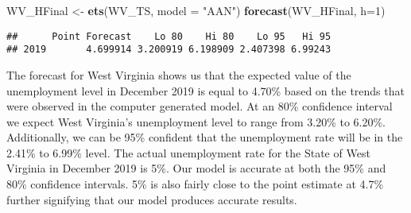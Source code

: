 \documentclass[
]{article}
\newenvironment{Shaded}{\begin{snugshade}}{\end{snugshade}}
\newcommand{\DataTypeTok}[1]{\textcolor[rgb]{0.13,0.29,0.53}{#1}}
\newcommand{\DecValTok}[1]{\textcolor[rgb]{0.00,0.00,0.81}{#1}}
\newcommand{\KeywordTok}[1]{\textcolor[rgb]{0.13,0.29,0.53}{\textbf{#1}}}
\newcommand{\NormalTok}[1]{#1}
\newcommand{\StringTok}[1]{\textcolor[rgb]{0.31,0.60,0.02}{#1}}
\begin{document}
\begin{Shaded}
\begin{Highlighting}[]
\NormalTok{WV_HFinal <-}\StringTok{ }\KeywordTok{ets}\NormalTok{(WV_TS, }\DataTypeTok{model =} \StringTok{"AAN"}\NormalTok{)}
\KeywordTok{forecast}\NormalTok{(WV_HFinal, }\DataTypeTok{h=}\DecValTok{1}\NormalTok{)}
\end{Highlighting}
\end{Shaded}

\begin{verbatim}
##      Point Forecast    Lo 80    Hi 80    Lo 95   Hi 95
## 2019       4.699914 3.200919 6.198909 2.407398 6.99243
\end{verbatim}

The forecast for West Virginia shows us that the expected value of the
unemployment level in December 2019 is equal to 4.70\% based on the
trends that were observed in the computer generated model. At an 80\%
confidence interval we expect West Virginia's unemployment level to
range from 3.20\% to 6.20\%. Additionally, we can be 95\% confident that
the unemployment rate will be in the 2.41\% to 6.99\% level. The actual
unemployment rate for the State of West Virginia in December 2019 is
5\%. Our model is accurate at both the 95\% and 80\% confidence
intervals. 5\% is also fairly close to the point estimate at 4.7\%
further signifying that our model produces accurate results.
\end{document}
